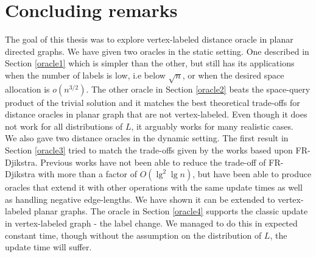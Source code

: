 \section{Concluding remarks}\label{conclusion}
The goal of this thesis was to explore vertex-labeled distance oracle in planar directed
graphs. We have given two oracles in the static setting. One described in Section
\ref{oracle1} which is simpler than the
other, but still has its applications when the number of labels is low, i.e below
$\sqrt{n}$, or when the desired space allocation is $o(n^{3/2})$. The other oracle in
Section \ref{oracle2} beats
the space-query product of the trivial solution and it matches the best theoretical
trade-offs for distance oracles in planar graph that are not vertex-labeled. Even though
it does not work for all distributions of $L$, it arguably works for many realistic
cases. \\
We also gave two distance oracles in the dynamic setting. The first result in Section
\ref{oracle3} tried to match the
trade-offs given by the works based upon FR-Djikstra. Previous works have not been able
to reduce the trade-off of FR-Djikstra with more than a factor of $O(\lg^2\lg n)$, but
have been able to produce oracles that extend it with other operations with the same
update times as well as handling negative edge-lengths. We have shown it can be extended to vertex-labeled planar graphs. The
oracle in Section \ref{oracle4} supports the classic update in vertex-labeled graph - the
label change. We managed to do this in expected constant time, though without the
assumption on the distribution of $L$, the update time will suffer.

